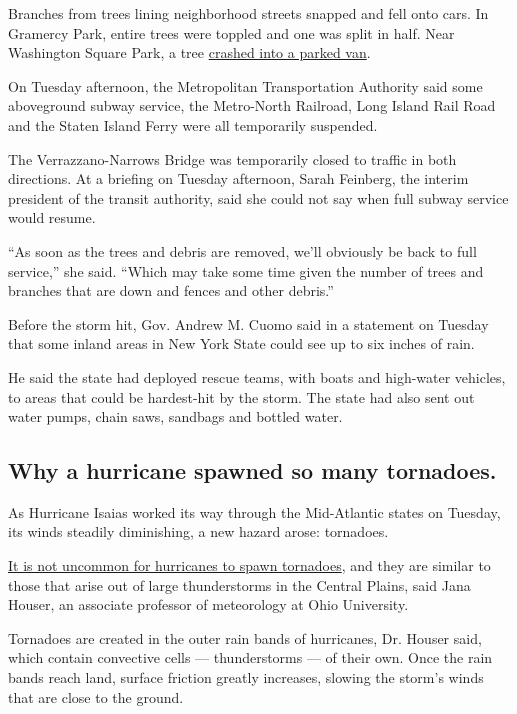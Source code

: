 Branches from trees lining neighborhood streets snapped and fell onto
cars. In Gramercy Park, entire trees were toppled and one was split in
half. Near Washington Square Park, a tree
\href{https://twitter.com/michelledozois/status/1290733797344935936}{crashed
into a parked van}.

On Tuesday afternoon, the Metropolitan Transportation Authority said
some aboveground subway service, the Metro-North Railroad, Long Island
Rail Road and the Staten Island Ferry were all temporarily suspended.

The Verrazzano-Narrows Bridge was temporarily closed to traffic in both
directions. At a briefing on Tuesday afternoon, Sarah Feinberg, the
interim president of the transit authority, said she could not say when
full subway service would resume.

``As soon as the trees and debris are removed, we'll obviously be back
to full service,'' she said. ``Which may take some time given the number
of trees and branches that are down and fences and other debris.''

Before the storm hit, Gov. Andrew M. Cuomo said in a statement on
Tuesday that some inland areas in New York State could see up to six
inches of rain.

He said the state had deployed rescue teams, with boats and high-water
vehicles, to areas that could be hardest-hit by the storm. The state had
also sent out water pumps, chain saws, sandbags and bottled water.

\hypertarget{why-a-hurricane-spawned-so-many-tornadoes}{%
\subsection{Why a hurricane spawned so many
tornadoes.}\label{why-a-hurricane-spawned-so-many-tornadoes}}

As Hurricane Isaias worked its way through the Mid-Atlantic states on
Tuesday, its winds steadily diminishing, a new hazard arose: tornadoes.

\href{https://www.nytimes.com/2020/08/04/climate/hurricanes-tornadoes.html}{It
is not uncommon for hurricanes to spawn tornadoes}, and they are similar
to those that arise out of large thunderstorms in the Central Plains,
said Jana Houser, an associate professor of meteorology at Ohio
University.

Tornadoes are created in the outer rain bands of hurricanes, Dr. Houser
said, which contain convective cells --- thunderstorms --- of their own.
Once the rain bands reach land, surface friction greatly increases,
slowing the storm's winds that are close to the ground.

